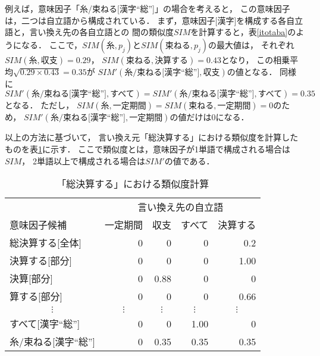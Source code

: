 例えば，意味因子「糸/束ねる[漢字``総'']」の場合を考えると，
この意味因子は，二つは自立語から構成されている．
まず，意味因子[漢字]を構成する各自立語と，言い換え先の各自立語との
間の類似度$SIM$を計算すると，表\ref{itotaba}のようになる．
ここで，$SIM(\mbox{糸},p_j)$と$SIM(\mbox{束ねる},p_j)$の最大値は，
それぞれ$SIM(\mbox{糸},\mbox{収支}) = 0.29$，
$SIM(\mbox{束ねる},\mbox{決算する}) = 0.43$となり，
この相乗平均$\sqrt{0.29\times 0.43}=0.35$が
$SIM'(\mbox{糸/束ねる[漢字``総'']},\mbox{収支})$の値となる．
同様に$SIM'(\mbox{糸/束ねる[漢字``総'']},\mbox{すべて}) = SIM'(\mbox{糸/束ねる[漢字``総'']},\mbox{すべて}) = 0.35$となる．
ただし，
$SIM(\mbox{糸},\mbox{一定期間}) = SIM(\mbox{束ねる},\mbox{一定期間}) = 0$のため，
$SIM'(\mbox{糸/束ねる[漢字``総'']},\mbox{一定期間})$の値だけは0になる．

以上の方法に基づいて，
言い換え元「総決算する」における類似度を計算したものを表\ref{sokessangm}に示す．
ここで類似度とは，意味因子が1単語で構成される場合は$SIM$，
2単語以上で構成される場合は$SIM'$の値である．

   \footnotesize
   \begin{table}[tb]
	\begin{center}
	 \caption{\label{sokessangm}「総決算する」における類似度計算}
	 \begin{tabular}{l|r|r|r|r} \hline
	           & \multicolumn{4}{|c}{言い換え先の自立語} \\ \cline{2-5}
	  意味因子候補                 & 一定期間 & 収支   & すべて & 決算する \\ \hline 
	  総決算する[全体] & 0 & 0      & 0      & 0.2      \\ 
	  決算する[部分]   & 0 & 0      & 0      & 1.00     \\ 
	  決算[部分]       & 0 & 0.88   & 0      & 0        \\ 
	  算する[部分]     & 0 & 0      & 0      & 0.66     \\ 
	  \multicolumn{1}{c|}{$\vdots$}     & \multicolumn{1}{|c|}{$\vdots$}& \multicolumn{1}{|c|}{$\vdots$}      & \multicolumn{1}{|c|}{$\vdots$}      & \multicolumn{1}{|c}{$\vdots$}     \\ 
	  すべて[漢字``総''] & 0  & 0  &  1.00  & 0        \\ 
	  糸/束ねる[漢字``総''] & 0 & 0.35    &  0.35     & 0.35    \\ \hline
	 \end{tabular}
	\end{center}
   \end{table}
   \normalsize

